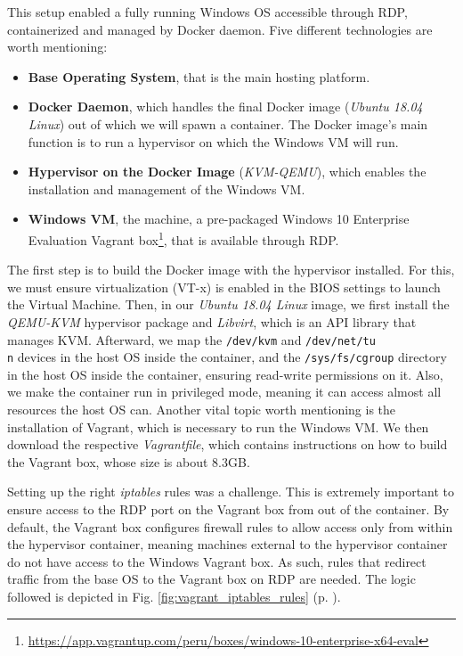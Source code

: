 This setup enabled a fully running Windows OS accessible through RDP, containerized and managed by Docker daemon. Five different technologies are worth mentioning:

\begin{itemize}
    \item \textbf{Base Operating System}, that is the main hosting platform.
    \item \textbf{Docker Daemon}, which handles the final Docker image (\textit{Ubuntu 18.04 Linux}) out of which we will spawn a container. The Docker image's main function is to run a hypervisor on which the Windows VM will run.
    \item \textbf{Hypervisor on the Docker Image} (\textit{KVM-QEMU}), which enables the installation and management of the Windows VM.
    \item \textbf{Windows VM}, the machine, a pre-packaged Windows 10 Enterprise Evaluation Vagrant box\footnote{\url{https://app.vagrantup.com/peru/boxes/windows-10-enterprise-x64-eval}}, that is available through RDP.
\end{itemize}

The first step is to build the Docker image with the hypervisor installed. For this, we must ensure virtualization (VT-x) is enabled in the BIOS settings to launch the Virtual Machine. Then, in our \textit{Ubuntu 18.04 Linux} image, we first install the \textit{QEMU-KVM} hypervisor package and \textit{Libvirt}, which is an API library that manages KVM. Afterward, we map the \texttt{/dev/kvm} and \texttt{/dev/net/tu\\n} devices in the host OS inside the container, and the \texttt{/sys/fs/cgroup} directory in the host OS inside the container, ensuring read-write permissions on it. Also, we make the container run in privileged mode, meaning it can access almost all resources the host OS can. Another vital topic worth mentioning is the installation of Vagrant, which is necessary to run the Windows VM. We then download the respective \textit{Vagrantfile}, which contains instructions on how to build the Vagrant box, whose size is about 8.3GB.

Setting up the right \textit{iptables} rules was a challenge. This is extremely important to ensure access to the RDP port on the Vagrant box from out of the container. By default, the Vagrant box configures firewall rules to allow access only from within the hypervisor container, meaning machines external to the hypervisor container do not have access to the Windows Vagrant box. As such, rules that redirect traffic from the base OS to the Vagrant box on RDP are needed. The logic followed is depicted in Fig. \ref{fig:vagrant_iptables_rules} (p. \pageref{fig:vagrant_iptables_rules}).

